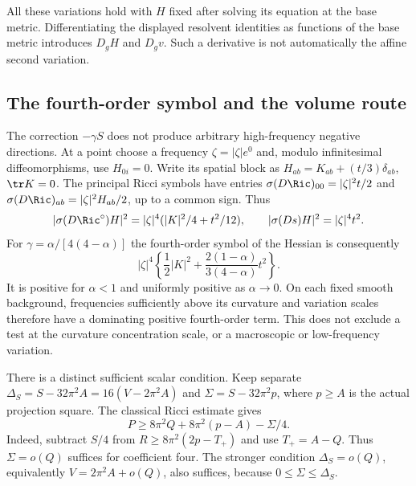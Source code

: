 All these variations hold with $H$ fixed after solving its equation
at the base metric.  Differentiating the displayed resolvent identities
as functions of the base metric introduces $D_gH$ and $D_gv$.
Such a derivative is not automatically the affine second variation.

\subsection{The fourth-order symbol and the volume route}

The correction $-\gamma S$ does not produce arbitrary high-frequency
negative directions.  At a point choose a frequency
$\zeta=|\zeta|e^0$ and, modulo infinitesimal diffeomorphisms, use
$H_{0i}=0$.  Write its spatial block as
$H_{ab}=K_{ab}+(t/3)\delta_{ab}$, $\tr K=0$.
The principal Ricci symbols have entries
$\sigma(D\Ric)_{00}=|\zeta|^2t/2$ and
$\sigma(D\Ric)_{ab}=|\zeta|^2H_{ab}/2$, up to a common sign.
Thus
\[
 |\sigma(D\Ric^\circ)H|^2
 =|\zeta|^4(|K|^2/4+t^2/12),\qquad
 |\sigma(Ds)H|^2=|\zeta|^4t^2.
\]
For $\gamma=\alpha/[4(4-\alpha)]$ the fourth-order symbol of the
Hessian is consequently
\begin{equation}\label{webvar:threshold-principal-symbol}
 |\zeta|^4\left\{\frac12|K|^2+
                    \frac{2(1-\alpha)}{3(4-\alpha)}t^2\right\}.
\end{equation}
It is positive for $\alpha<1$ and uniformly positive as $\alpha\to0$.
On each fixed smooth background, frequencies sufficiently above its
curvature and variation scales therefore have a dominating positive
fourth-order term.  This does not exclude a test at the curvature
concentration scale, or a macroscopic or low-frequency variation.

There is a distinct sufficient scalar condition.  Keep separate
$\Delta_S=S-32\pi^2A=16(V-2\pi^2A)$ and
$\Sigma=S-32\pi^2p$, where $p\ge A$ is the actual projection square.
The classical Ricci estimate gives
\begin{equation}\label{webvar:scalar-slack-route}
 P\ge8\pi^2Q+8\pi^2(p-A)-\Sigma/4.
\end{equation}
Indeed, subtract $S/4$ from $R\ge8\pi^2(2p-T_+)$ and use
$T_+=A-Q$.  Thus $\Sigma=o(Q)$ suffices for coefficient four.
The stronger condition $\Delta_S=o(Q)$, equivalently
$V=2\pi^2A+o(Q)$, also suffices, because
$0\le\Sigma\le\Delta_S$.

